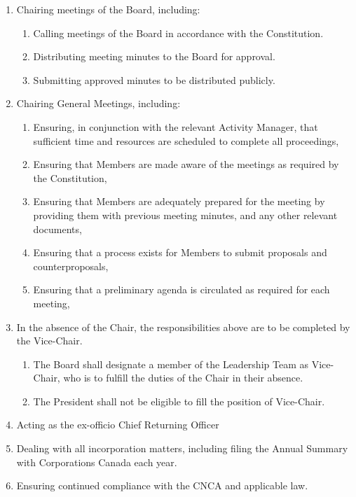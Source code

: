 \begin{enumerate}
 \item Chairing meetings of the Board, including:
  \begin{enumerate}
   \item Calling meetings of the Board in accordance with the Constitution.
   \item Distributing meeting minutes to the Board for approval.
   \item Submitting approved minutes to be distributed publicly.
  \end{enumerate}
 \item Chairing General Meetings, including:
  \begin{enumerate}
   \item Ensuring, in conjunction with the relevant Activity Manager, that sufficient time and resources are scheduled to complete all proceedings,
   \item Ensuring that Members are made aware of the meetings as required by the Constitution,
   \item Ensuring that Members are adequately prepared for the meeting by providing them with previous meeting minutes, and any other relevant documents,
   \item Ensuring that a process exists for Members to submit proposals and counterproposals,
   \item Ensuring that a preliminary agenda is circulated as required for each meeting,
  \end{enumerate}
 \item In the absence of the Chair, the responsibilities above are to be completed by the Vice-Chair.
  \begin{enumerate}
   \item The Board shall designate a member of the Leadership Team as Vice-Chair, who is to fulfill the duties of the Chair in their absence.
   \item The President shall not be eligible to fill the position of Vice-Chair.
  \end{enumerate}
 \item Acting as the ex-officio Chief Returning Officer
 \item Dealing with all incorporation matters, including filing the Annual Summary with Corporations Canada each year.
 \item Ensuring continued compliance with the CNCA and applicable law.
\end{enumerate}
